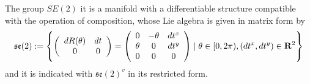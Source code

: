 The group $SE(2)$ it is a manifold with a differentiable structure compatible with the operation of composition, whose Lie algebra is given in matrix form by
\begin{align*}
\mathfrak{se}(2) := 
\left \{
\left (
\begin{array} {c c }
dR(\theta) & dt \\
0 & 0
\end{array}
\right )
=
\left (
\begin{array} {c c c }
0 & -\theta &  dt^{x} \\
\theta & 0 & dt^{y} \\
0& 0 & 0
\end{array}
\right )
\mid
\theta \in  [0, 2\pi), (dt^x, dt^y) \in\mathbf{R}^2
\right \}
\end{align*}
and it is indicated with $\mathfrak{se}(2)^{v}$ in its restricted form.

